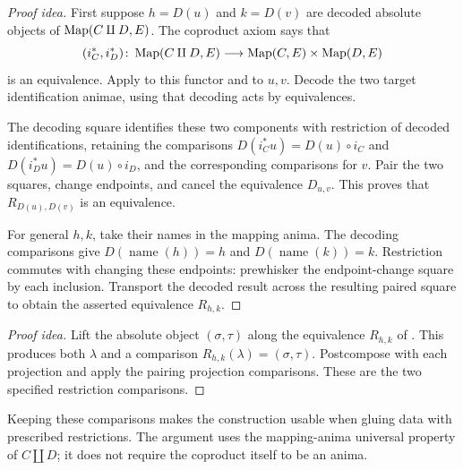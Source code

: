 \documentclass[11pt]{article}
\begin{document}
\begin{proof}[Proof idea]
First suppose $h=D(u)$ and $k=D(v)$ are decoded absolute objects of
$\operatorname{Map}(C\amalg D,E)$. The coproduct axiom says that
\[
 (i_C^*,i_D^*)\colon\operatorname{Map}(C\amalg D,E)
                  \longrightarrow\operatorname{Map}(C,E)\times\operatorname{Map}(D,E)
\]
is an equivalence. Apply 
to this functor and to $u,v$. Decode the two target identification
animae, using that decoding acts by equivalences.

The decoding square identifies these two components with restriction
of decoded identifications, retaining the comparisons
$D(i_C^*u)=D(u)\circ i_C$ and $D(i_D^*u)=D(u)\circ i_D$, and the
corresponding comparisons for $v$. Pair the two squares, change endpoints,
and cancel the equivalence $D_{u,v}$. This proves that
$R_{D(u),D(v)}$ is an equivalence.

For general $h,k$, take their names in the mapping anima. The decoding
comparisons give $D(\operatorname{name}(h))=h$ and
$D(\operatorname{name}(k))=k$. Restriction commutes with changing these
endpoints: prewhisker the endpoint-change square by each inclusion.
Transport the decoded result across the resulting paired square to
obtain the asserted equivalence $R_{h,k}$.
\end{proof}

\begin{proof}[Proof idea]
Lift the absolute object $(\sigma,\tau)$ along the equivalence $R_{h,k}$
of . This produces both
$\lambda$ and a comparison $R_{h,k}(\lambda)=(\sigma,\tau)$.
Postcompose with each projection and apply the pairing projection
comparisons. These are the two specified restriction comparisons.
\end{proof}

Keeping these comparisons makes the construction usable when gluing
data with prescribed restrictions. The argument uses the mapping-anima
universal property of $C\amalg D$; it does not require the coproduct
itself to be an anima.
\end{document}
